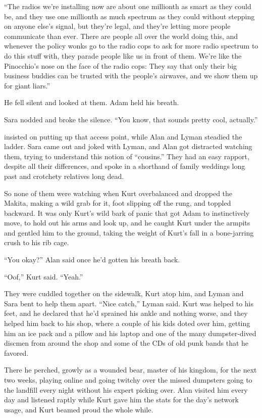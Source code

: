 ``The radios we're installing now are about one millionth as smart as
they could be, and they use one millionth as much spectrum as they
could without stepping on anyone else's signal, but they're legal, and
they're letting more people communicate than ever.  There are people
all over the world doing this, and whenever the policy wonks go to the
radio cops to ask for more radio spectrum to do this stuff with, they
parade people like us in front of them.  We're like the Pinocchio's
nose on the face of the radio cops:  They say that only their big
business buddies can be trusted with the people's airwaves, and we
show them up for giant liars.''

He fell silent and looked at them.  Adam held his breath.

Sara nodded and broke the silence.  ``You know, that sounds pretty
cool, actually.''

 insisted on putting up that access point, while Alan and Lyman
steadied the ladder.  Sara came out and joked with Lyman, and Alan got
distracted watching them, trying to understand this notion of
``cousins.'' They had an easy rapport, despite all their differences,
and spoke in a shorthand of family weddings long past and crotchety
relatives long dead.

So none of them were watching when Kurt overbalanced and dropped the
Makita, making a wild grab for it, foot slipping off the rung, and
toppled backward.  It was only Kurt's wild bark of panic that got Adam
to instinctively move, to hold out his arms and look up, and he caught
Kurt under the armpits and gentled him to the ground, taking the
weight of Kurt's fall in a bone-jarring crush to his rib cage.

``You okay?'' Alan said once he'd gotten his breath back.

``Oof,'' Kurt said.  ``Yeah.''

They were cuddled together on the sidewalk, Kurt atop him, and Lyman
and Sara bent to help them apart.  ``Nice catch,'' Lyman said.  Kurt
was helped to his feet, and he declared that he'd sprained his ankle
and nothing worse, and they helped him back to his shop, where a
couple of his kids doted over him, getting him an ice pack and a
pillow and his laptop and one of the many dumpster-dived discmen from
around the shop and some of the CDs of old punk bands that he favored.

There he perched, growly as a wounded bear, master of his kingdom, for
the next two weeks, playing online and going twitchy over the missed
dumpsters going to the landfill every night without his expert picking
over.  Alan visited him every day and listened raptly while Kurt gave
him the stats for the day's network usage, and Kurt beamed proud the
whole while.

